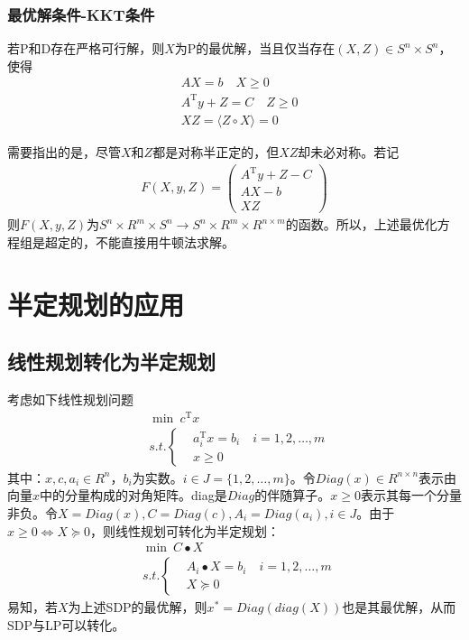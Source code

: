         \subsubsection{最优解条件-KKT条件}
            \par
            若P和D存在严格可行解，则$X$为P的最优解，当且仅当存在$(X,Z)\in S^n\times S^n$，使得
            \begin{align*}
              & AX=b\quad X\geqslant 0\\
              & A^\mathrm{T} y+Z=C\quad Z \geqslant 0\\
              & XZ=\langle{Z\circ X}\rangle=0
            \end{align*}
            \par
            需要指出的是，尽管$X$和$Z$都是对称半正定的，但$XZ$却未必对称。若记
            \begin{align*}
              F(X,y,Z)=\begin{pmatrix} A^\mathrm{T} y+Z-C \\AX-b\\XZ\end{pmatrix}
            \end{align*}
            则$F(X,y,Z)$为$S^n\times R^m\times S^n\to S^n\times R^m\times R^{n\times m}$的函数。所以，上述最优化方程组是超定的，不能直接用牛顿法求解。
\section{半定规划的应用}
    \subsection{线性规划转化为半定规划}
        \par
        考虑如下线性规划问题
        \begin{align*}
          & \mathop{\min} \ c^\mathrm{T}  x\\
          & s.t.\left\{
          \begin{aligned}
          &  a_i^\mathrm{T} x=b_i\quad i=1,2,\ldots ,m\\
          & x \geqslant 0
          \end{aligned}
          \right.
        \end{align*}
        其中：$x,c,a_i\in R^n$，$b_i$为实数。$i\in J=\{1,2,\ldots ,m\}$。令$Diag(x)\in R^{n\times n}$表示由向量$x$中的分量构成的对角矩阵。diag是$Diag$的伴随算子。$x\geqslant 0$表示其每一个分量非负。令$X=Diag(x),C=Diag(c),A_i=Diag(a_i),i\in J$。由于$x\geqslant 0\Leftrightarrow X\succeq 0$，则线性规划可转化为半定规划：
        \begin{align*}
          & \mathop{\min} \  C\bullet X\\
          & s.t.\left\{
          \begin{aligned}
          & A_i\bullet X=b_i\quad i=1,2,\ldots ,m\\
          & X \succeq 0
          \end{aligned}
          \right.
        \end{align*}
        易知，若$X$为上述SDP的最优解，则$x^*=Diag(diag(X))$也是其最优解，从而SDP与LP可以转化。

